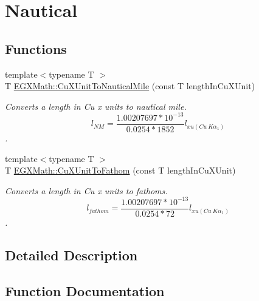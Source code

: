 \hypertarget{group___e_g_x_math-_conversions-_length_conversions-_non-_s_i-_cu_x_unit-_nautical}{}\section{Nautical}
\label{group___e_g_x_math-_conversions-_length_conversions-_non-_s_i-_cu_x_unit-_nautical}
\subsection*{Functions}
\begin{DoxyCompactItemize}
\item 
{\footnotesize template$<$typename T $>$ }\\T \mbox{\hyperlink{group___e_g_x_math-_conversions-_length_conversions-_non-_s_i-_cu_x_unit-_nautical_gaaa51a984890efeec739a702b982fad57}{E\+G\+X\+Math\+::\+Cu\+X\+Unit\+To\+Nautical\+Mile}} (const T length\+In\+Cu\+X\+Unit)
\begin{DoxyCompactList}\small\item\em Converts a length in Cu x units to nautical mile. \[ l_{NM}= \frac{1.00207697*10^{-13}}{0.0254 * 1852} l_{xu(Cu\ K\alpha_1)} \]. \end{DoxyCompactList}\item 
{\footnotesize template$<$typename T $>$ }\\T \mbox{\hyperlink{group___e_g_x_math-_conversions-_length_conversions-_non-_s_i-_cu_x_unit-_nautical_ga7a3671693beab30a832008ca1294732f}{E\+G\+X\+Math\+::\+Cu\+X\+Unit\+To\+Fathom}} (const T length\+In\+Cu\+X\+Unit)
\begin{DoxyCompactList}\small\item\em Converts a length in Cu x units to fathoms. \[ l_{fathom}= \frac{1.00207697*10^{-13}}{0.0254 * 72} l_{xu(Cu\ K\alpha_1)} \]. \end{DoxyCompactList}\end{DoxyCompactItemize}


\subsection{Detailed Description}


\subsection{Function Documentation}
\mbox{\label{group___e_g_x_math-_conversions-_length_conversions-_non-_s_i-_cu_x_unit-_nautical_ga7a3671693beab30a832008ca1294732f}} 
